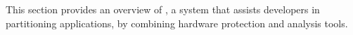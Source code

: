 \label{sec:overview}

This section provides an overview of \sysname{},
a system that assists developers in partitioning \java{} applications,
by combining \sgx{} hardware protection and \java{} analysis tools.

\begin{comment}


There are multiple approaches to access \sgx{} hardware from \java{} applications as illustrated in Figure~\ref{fig:alternatives}. Firstly, the whole \java{} application can run with the \jvm{} inside the enclaves,
using a \sgx{} like Haven~\cite{baumann14haven}({\em libOS-based}).
Secondly, the untrusted components of \java{} application
can run with the \jvm{} outside the enclaves, and a JNI wrapper can communicate
with the trusted component written in native language running inside the enclave like ~\cite{vc3}({\em JNI-based}). 
However,the JNI-based approach requires developers to have the knowledge of
enclave implementation, and loses the language protection of \java{} inside the enclaves.
A more plausible approach is to provide enclave-backed APIs
from the \jvm{},
to support common use cases ({\em \jvm{}-based})), such as a secure key-value store~\cite{vc3}.
Although the \jvm{}-based approach can save the application developers' effort
of implementing isolated components,
the use cases is limited to the pre-defined operations provided by the \jvm{} or the companion frameworks.
Because the backend implementation (isolated components and untrusted interfaces) in the \jvm{}-based approach is the same as the JNI-based approach,
the same language restriction also applies here. 

\end{comment}

